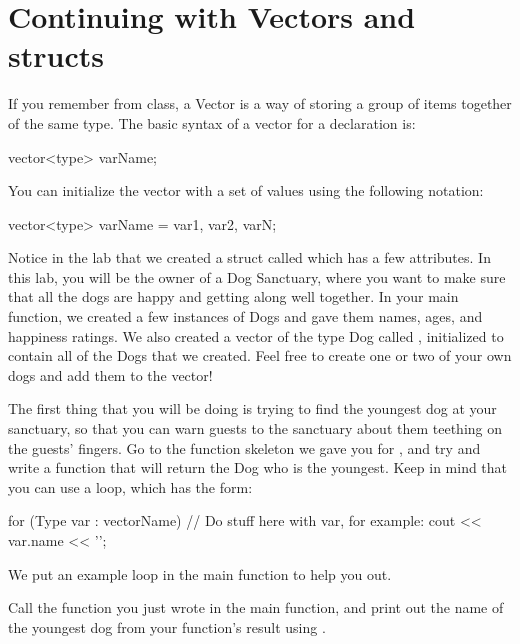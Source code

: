 \documentclass{tufte-handout}
\begin{document}
\section{Continuing with Vectors and structs}
If you remember from class, a Vector is a way of storing a group of items together of the same type.  The basic syntax of a vector for a declaration is:
\begin{Code}
vector<type> varName;
\end{Code}

You can initialize the vector with a set of values using the following notation:
\begin{Code}
vector<type> varName = {var1, var2, varN};
\end{Code}

Notice in the lab that we created a struct called  which has a few attributes.  In this lab, you will be the owner of a Dog Sanctuary, where you want to make sure that all the dogs are happy and getting along well together.  In your main function, we created a few instances of Dogs and gave them names, ages, and happiness ratings.  We also created a vector of the type Dog called , initialized to contain all of the Dogs that we created.  Feel free to create one or two of your own dogs and add them to the vector!


The first thing that you will be doing is trying to find the youngest dog at your sanctuary, so that you can warn guests to the sanctuary about them teething on the guests' fingers.  Go to the function skeleton we gave you for , and try and write a function that will return the Dog who is the youngest. Keep in mind that you can use a  loop, which has the form:
\begin{Code}
    for (Type var : vectorName) {
        // Do stuff here with var, for example:
        cout << var.name << '\n';
    }
\end{Code}

We put an example  loop in the main function to help you out.

Call the function you just wrote in the main function, and print out the name of the youngest dog from your function's result using .  
\end{document}
